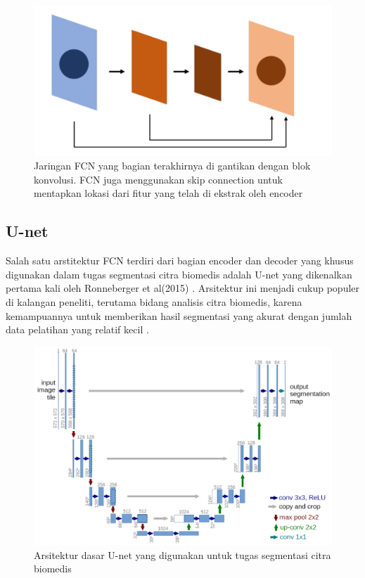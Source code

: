 \begin{figure}[H]
	\centering
	\includegraphics[scale=.2]{gambar/gambar-fcn.png}
	\caption{Jaringan FCN yang bagian terakhirnya di gantikan dengan blok konvolusi. FCN juga menggunakan skip connection untuk mentapkan lokasi dari fitur yang telah di ekstrak oleh encoder}
	\label{fig:fcn}
\end{figure}


\subsection{U-net}

\noindent Salah satu arstitektur FCN terdiri dari bagian encoder dan decoder yang khusus digunakan dalam tugas segmentasi citra biomedis adalah U-net yang dikenalkan pertama kali oleh Ronneberger et al(2015) \cite{ronneberger_u-net_2015}. Arsitektur ini menjadi cukup populer di kalangan peneliti, terutama bidang analisis citra biomedis, karena kemampuannya untuk memberikan hasil segmentasi yang akurat dengan jumlah data pelatihan yang relatif kecil \cite{williams_unified_2023}.

\begin{figure}[H]
	\centering
	\includegraphics[scale=.2]{gambar/U-net.png}
	\caption{Arsitektur dasar U-net yang digunakan untuk tugas segmentasi citra biomedis}
	\label{fig:U-net}
\end{figure}

